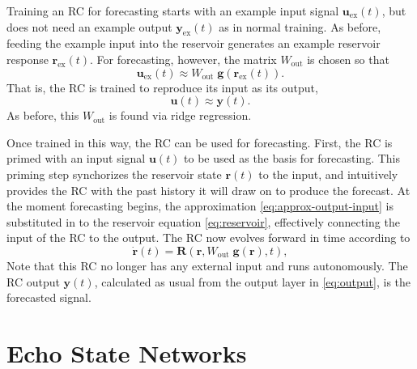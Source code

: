 Training an RC for forecasting starts with an example input signal
$\bm{u}_\text{ex}(t)$, but does not need an example output
$\bm{y}_\text{ex}(t)$ as in normal training. As before, feeding the
example input into the reservoir generates an example reservoir
response $\bm{r}_\text{ex}(t)$. For forecasting, however, the matrix
$W_\text{out}$ is chosen so that
\begin{equation}
  \label{eq:approx-output-forecast}
  \mathbf{u}_\text{ex}(t) \approx W_\text{out}\;\mathbf{g}\left(\mathbf{r}_\text{ex}(t)\right).
\end{equation}
That is, the RC is trained to reproduce its input as its output,
\begin{equation}
  \label{eq:approx-output-input}
  \bm{u}(t) \approx \bm{y}(t).
\end{equation}
As before, this $W_\text{out}$ is found via ridge regression.

Once trained in this way, the RC can be used for forecasting. First,
the RC is primed with an input signal $\bm{u}(t)$ to be used as the
basis for forecasting. This priming step synchorizes the reservoir
state $\bm{r}(t)$ to the input, and intuitively provides the RC with
the past history it will draw on to produce the forecast. At the
moment forecasting begins, the approximation
\cref{eq:approx-output-input} is substituted in to the reservoir
equation \cref{eq:reservoir}, effectively connecting the input of the
RC to the output. The RC now evolves forward in time according to
\begin{equation}
  \label{eq:reservoir-auto}
  \dot{\mathbf{r}}(t) = \mathbf{R}\left(\mathbf{r}, W_\text{out}\;\bm{g}(\bm{r}), t\right),
\end{equation}
Note that this RC no longer has any external input and runs
autonomously. The RC output $\bm{y}(t)$, calculated as usual from the
output layer in \cref{eq:output}, is the forecasted signal.

\section{Echo State Networks}\label{sec:esn}

